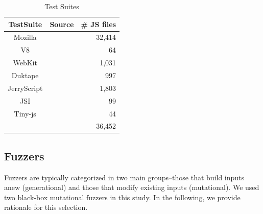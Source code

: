 \documentclass[10pt,conference,anonymous]{IEEEtran}
\begin{document}
\begin{table}[t]
  \centering
  \caption{\label{tab:test-suites}Test Suites
  }
  \begin{tabular}{ccr}
    \toprule
    TestSuite & Source & \# JS files \\
    \midrule
    Mozilla & \cite{mozilla} & 32,414 \\
    V8 & \cite{v8} & 64 \\
    WebKit & \cite{webkit} & 1,031 \\
    \midrule    
    Duktape & \cite{duktape} & 997 \\
    JerryScript & \cite{jerryscript} & 1,803 \\
    JSI & \cite{jsi} & 99 \\
    Tiny-js & \cite{tinyjs} & 44 \\    
    \midrule
     &  & 36,452 \\
   \bottomrule     
  \end{tabular}
\end{table}


\subsection{Fuzzers}
\label{sec:objects:fuzzers}


Fuzzers are typically categorized in two main groups--those that build
inputs anew (generational) and those that modify existing inputs
(mutational). We used two black-box mutational
fuzzers
in this study. In the following, we provide rationale for this
selection.
\end{document}
